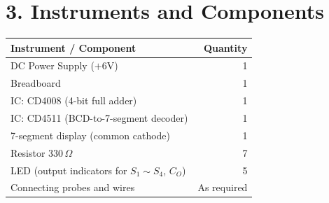 \section*{3. Instruments and Components}

\begin{table}[H]
\centering
\small
\begin{tabularx}{0.8\textwidth}{X r}
\toprule
\textbf{Instrument / Component} & \textbf{Quantity} \\
\midrule
DC Power Supply ($+6\text{V}$) & 1 \\
Breadboard & 1 \\
IC: CD4008 (4-bit full adder) & 1 \\
IC: CD4511 (BCD-to-7-segment decoder) & 1 \\
7-segment display (common cathode) & 1 \\
Resistor $330\,\Omega$ & 7 \\
LED (output indicators for $S_1 \sim S_4$, $C_O$) & 5 \\
Connecting probes and wires & As required \\
\bottomrule
\end{tabularx}
\end{table}
